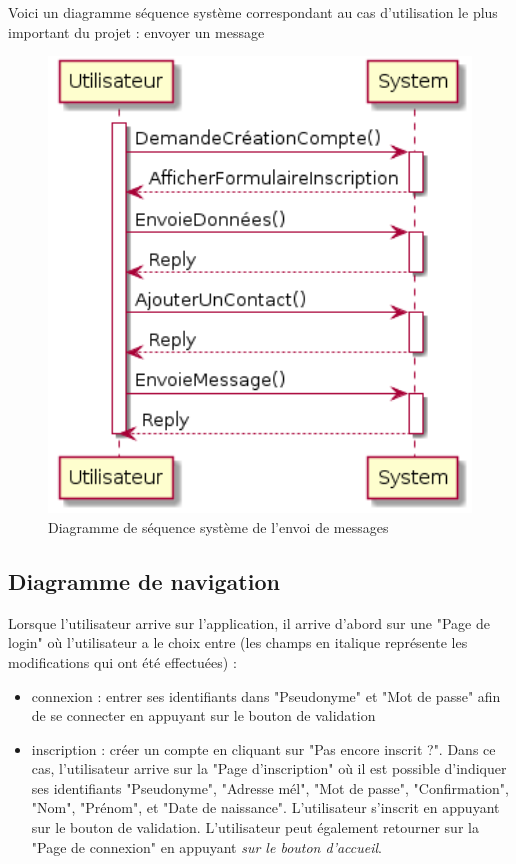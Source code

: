 	
	Voici un diagramme séquence système correspondant au cas d'utilisation le plus important du projet : envoyer un message
	\begin{figure}[H]
		\centerline{\includegraphics[width=12.5cm]{img/sequenceSystemeEnvoiMessage.png}}
		\caption{Diagramme de séquence système de l'envoi de messages}
	\end{figure}

	\newpage

	\subsection{Diagramme de navigation}
	Lorsque l'utilisateur arrive sur l'application, il arrive d'abord sur une "Page de login" où l'utilisateur a le choix entre (les champs en italique représente les modifications qui ont été effectuées) :
	\begin{itemize}
		\item connexion : entrer ses identifiants dans "Pseudonyme" et "Mot de passe" afin de se connecter en appuyant sur le bouton de validation
		\item inscription : créer un compte en cliquant sur "Pas encore inscrit ?".
		Dans ce cas, l'utilisateur arrive sur la "Page d'inscription" où il est possible d'indiquer ses identifiants "Pseudonyme", "Adresse mél", "Mot de passe", "Confirmation", "Nom", "Prénom", et "Date de naissance".
		L'utilisateur s'inscrit en appuyant sur le bouton de validation.
		L'utilisateur peut également retourner sur la "Page de connexion" en appuyant \textit{sur le bouton d'accueil}.\\
	\end{itemize}

